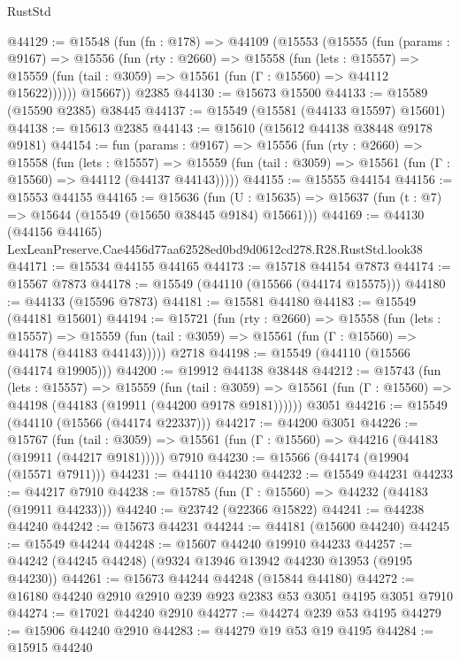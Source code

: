 \begin{lexlean}{RustStd}
\begin{coremodule}
@44129 := @15548
    (fun (fn : @178) =>
    @44109
      (@15553
        (@15555
          (fun (params : @9167) =>
          @15556
            (fun (rty : @2660) =>
            @15558
              (fun (lets : @15557) =>
              @15559 (fun (tail : @3059) => @15561 (fun (Γ : @15560) => @44112 @15622))))))
        @15667))
    @2385
@44130 := @15673 @15500
@44133 := @15589 (@15590 @2385) @38445
@44137 := @15549 (@15581 (@44133 @15597) @15601)
@44138 := @15613 @2385
@44143 := @15610 (@15612 @44138 @38448 @9178 @9181)
@44154 := fun (params : @9167) =>
  @15556
    (fun (rty : @2660) =>
    @15558
      (fun (lets : @15557) =>
      @15559 (fun (tail : @3059) => @15561 (fun (Γ : @15560) => @44112 (@44137 @44143)))))
@44155 := @15555 @44154
@44156 := @15553 @44155
@44165 := @15636
    (fun (U : @15635) => @15637 (fun (t : @7) => @15644 (@15549 (@15650 @38445 @9184) @15661)))
@44169 := @44130
    (@44156 @44165)
    LexLeanPreserve.Cae4456d77aa62528ed0bd9d0612cd278.R28.RustStd.look38
@44171 := @15534 @44155 @44165
@44173 := @15718 @44154 @7873
@44174 := @15567 @7873
@44178 := @15549 (@44110 (@15566 (@44174 @15575)))
@44180 := @44133 (@15596 @7873)
@44181 := @15581 @44180
@44183 := @15549 (@44181 @15601)
@44194 := @15721
    (fun (rty : @2660) =>
    @15558
      (fun (lets : @15557) =>
      @15559 (fun (tail : @3059) => @15561 (fun (Γ : @15560) => @44178 (@44183 @44143)))))
    @2718
@44198 := @15549 (@44110 (@15566 (@44174 @19905)))
@44200 := @19912 @44138 @38448
@44212 := @15743
    (fun (lets : @15557) =>
    @15559
      (fun (tail : @3059) =>
      @15561 (fun (Γ : @15560) => @44198 (@44183 (@19911 (@44200 @9178 @9181))))))
    @3051
@44216 := @15549 (@44110 (@15566 (@44174 @22337)))
@44217 := @44200 @3051
@44226 := @15767
    (fun (tail : @3059) => @15561 (fun (Γ : @15560) => @44216 (@44183 (@19911 (@44217 @9181)))))
    @7910
@44230 := @15566 (@44174 (@19904 (@15571 @7911)))
@44231 := @44110 @44230
@44232 := @15549 @44231
@44233 := @44217 @7910
@44238 := @15785 (fun (Γ : @15560) => @44232 (@44183 (@19911 @44233)))
@44240 := @23742 (@22366 @15822)
@44241 := @44238 @44240
@44242 := @15673 @44231
@44244 := @44181 (@15600 @44240)
@44245 := @15549 @44244
@44248 := @15607 @44240 @19910 @44233
@44257 := @44242 (@44245 @44248) (@9324 @13946 @13942 @44230 @13953 (@9195 @44230))
@44261 := @15673 @44244 @44248 (@15844 @44180)
@44272 := @16180 @44240 @2910 @2910 @239 @923 @2383 @53 @3051 @4195 @3051 @7910
@44274 := @17021 @44240 @2910
@44277 := @44274 @239 @53 @4195
@44279 := @15906 @44240 @2910
@44283 := @44279 @19 @53 @19 @4195
@44284 := @15915 @44240

\end{coremodule}
\end{lexlean}
